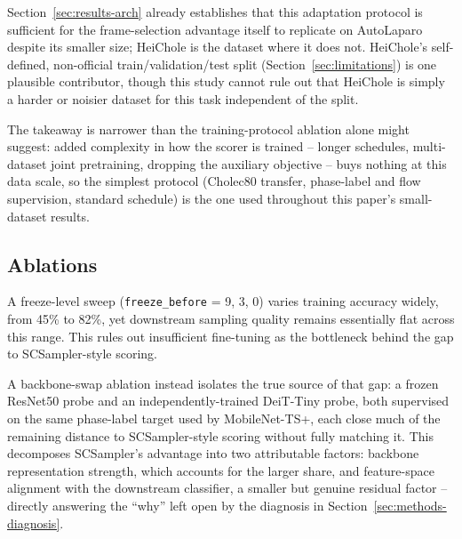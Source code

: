\documentclass[preprint,12pt]{elsarticle}
\begin{document}
Section~\ref{sec:results-arch} already establishes that this adaptation protocol is sufficient for the frame-selection advantage itself to replicate on AutoLaparo despite its smaller size; HeiChole is the dataset where it does not. HeiChole's self-defined, non-official train/validation/test split (Section~\ref{sec:limitations}) is one plausible contributor, though this study cannot rule out that HeiChole is simply a harder or noisier dataset for this task independent of the split.

The takeaway is narrower than the training-protocol ablation alone might suggest: added complexity in how the scorer is trained -- longer schedules, multi-dataset joint pretraining, dropping the auxiliary objective -- buys nothing at this data scale, so the simplest protocol (Cholec80 transfer, phase-label and flow supervision, standard schedule) is the one used throughout this paper's small-dataset results.

\subsection{Ablations}
\label{sec:results-ablation}

A freeze-level sweep (\texttt{freeze\_before} = 9, 3, 0) varies training accuracy widely, from 45\% to 82\%, yet downstream sampling quality remains essentially flat across this range. This rules out insufficient fine-tuning as the bottleneck behind the gap to SCSampler-style scoring.

A backbone-swap ablation instead isolates the true source of that gap: a frozen ResNet50 probe and an independently-trained DeiT-Tiny probe, both supervised on the same phase-label target used by MobileNet-TS+, each close much of the remaining distance to SCSampler-style scoring without fully matching it. This decomposes SCSampler's advantage into two attributable factors: backbone representation strength, which accounts for the larger share, and feature-space alignment with the downstream classifier, a smaller but genuine residual factor -- directly answering the ``why'' left open by the diagnosis in Section~\ref{sec:methods-diagnosis}.
\end{document}
